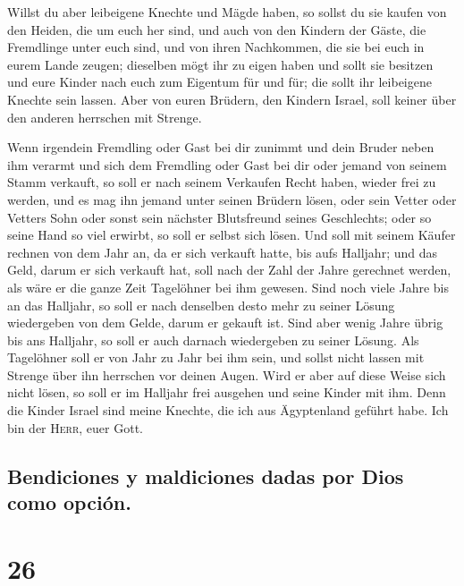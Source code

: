  Willst du aber leibeigene Knechte und Mägde haben, so
sollst du sie kaufen von den Heiden, die um euch her sind,
 und auch von den Kindern der Gäste, die Fremdlinge unter
euch sind, und von ihren Nachkommen, die sie bei euch in eurem Lande
zeugen; dieselben mögt ihr zu eigen haben  und sollt sie
besitzen und eure Kinder nach euch zum Eigentum für und für; die sollt
ihr leibeigene Knechte sein lassen. Aber von euren Brüdern, den Kindern
Israel, soll keiner über den anderen herrschen mit Strenge.

 Wenn irgendein Fremdling oder Gast bei dir zunimmt und
dein Bruder neben ihm verarmt und sich dem Fremdling oder Gast bei dir
oder jemand von seinem Stamm verkauft,  so soll er nach
seinem Verkaufen Recht haben, wieder frei zu werden, und es mag ihn
jemand unter seinen Brüdern lösen,  oder sein Vetter oder
Vetters Sohn oder sonst sein nächster Blutsfreund seines Geschlechts;
oder so seine Hand so viel erwirbt, so soll er selbst sich lösen.
 Und soll mit seinem Käufer rechnen von dem Jahr an, da
er sich verkauft hatte, bis aufs Halljahr; und das Geld, darum er sich
verkauft hat, soll nach der Zahl der Jahre gerechnet werden, als wäre er
die ganze Zeit Tagelöhner bei ihm gewesen.  Sind noch
viele Jahre bis an das Halljahr, so soll er nach denselben desto mehr zu
seiner Lösung wiedergeben von dem Gelde, darum er gekauft ist.
 Sind aber wenig Jahre übrig bis ans Halljahr, so soll er
auch darnach wiedergeben zu seiner Lösung.  Als
Tagelöhner soll er von Jahr zu Jahr bei ihm sein, und sollst nicht
lassen mit Strenge über ihn herrschen vor deinen Augen. 
Wird er aber auf diese Weise sich nicht lösen, so soll er im Halljahr
frei ausgehen und seine Kinder mit ihm.  Denn die Kinder
Israel sind meine Knechte, die ich aus Ägyptenland geführt habe. Ich bin
der \textsc{Herr}, euer Gott.

\hypertarget{bendiciones-y-maldiciones-dadas-por-dios-como-opciuxf3n.}{%
\subsection{Bendiciones y maldiciones dadas por Dios como
opción.}\label{bendiciones-y-maldiciones-dadas-por-dios-como-opciuxf3n.}}

\hypertarget{section-25}{%
\section{26}\label{section-25}}

